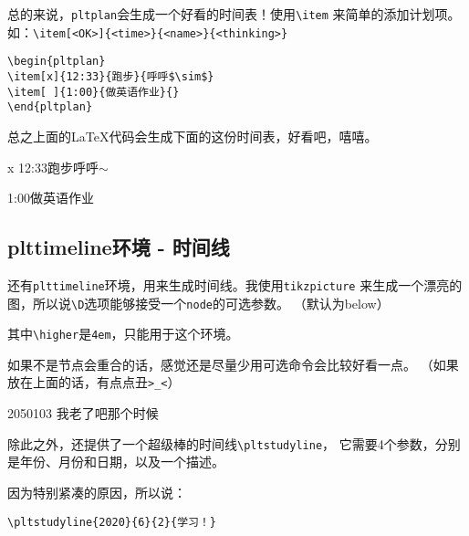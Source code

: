 \documentclass{peterlitsdoc}
\newcommand{\vb}{\verb}
\begin{document}
总的来说，\vb|pltplan|会生成一个好看的时间表！使用\vb|\item|
来简单的添加计划项。如：\vb|\item[<OK>]{<time>}{<name>}{<thinking>}|

\begin{lstlisting}
\begin{pltplan}
\item[x]{12:33}{跑步}{呼呼$\sim$}
\item[ ]{1:00}{做英语作业}{}
\end{pltplan}
\end{lstlisting}

总之上面的\LaTeX{}代码会生成下面的这份时间表，好看吧，嘻嘻。

\begin{pltplan}
\item[x]{12:33}{跑步}{呼呼$\sim$}
\item[ ]{1:00}{做英语作业}{}
\end{pltplan}


\subsection{plttimeline环境 - 时间线}

还有\vb|plttimeline|环境，用来生成时间线。我使用\vb|tikzpicture|%
来生成一个漂亮的图，所以说\vb|\D|选项能够接受一个\vb|node|的可选参数。
（默认为below）

其中\vb|\higher|是\vb|4em|，只能用于这个环境。

如果不是节点会重合的话，感觉还是尽量少用可选命令会比较好看一点。
（如果放在上面的话，有点点丑\vb|>_<|）

\begin{pltrun}
\begin{plttimeline}{2050}{10}{3}
    {我老了吧那个时候}
\end{plttimeline}
\end{pltrun}

除此之外，还提供了一个超级棒的时间线\vb|\pltstudyline|，
它需要4个参数，分别是年份、月份和日期，以及一个描述。

因为特别紧凑的原因，所以说：

\begin{lstlisting}
\pltstudyline{2020}{6}{2}{学习！}
\end{lstlisting}
\end{document}

